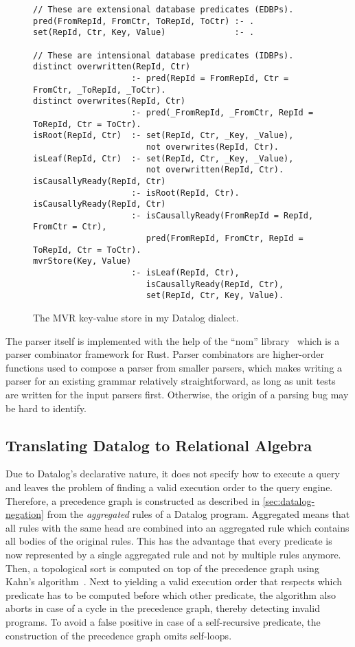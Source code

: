 \begin{figure}[htpb]
	\begin{lstlisting}[keepspaces]
// These are extensional database predicates (EDBPs).
pred(FromRepId, FromCtr, ToRepId, ToCtr) :- .
set(RepId, Ctr, Key, Value)              :- .

// These are intensional database predicates (IDBPs).
distinct overwritten(RepId, Ctr)
                    :- pred(RepId = FromRepId, Ctr = FromCtr, _ToRepId, _ToCtr).
distinct overwrites(RepId, Ctr)
                    :- pred(_FromRepId, _FromCtr, RepId = ToRepId, Ctr = ToCtr).
isRoot(RepId, Ctr)  :- set(RepId, Ctr, _Key, _Value),
                       not overwrites(RepId, Ctr).
isLeaf(RepId, Ctr)  :- set(RepId, Ctr, _Key, _Value),
                       not overwritten(RepId, Ctr).
isCausallyReady(RepId, Ctr)
                    :- isRoot(RepId, Ctr).
isCausallyReady(RepId, Ctr)
                    :- isCausallyReady(FromRepId = RepId, FromCtr = Ctr),
                       pred(FromRepId, FromCtr, RepId = ToRepId, Ctr = ToCtr).
mvrStore(Key, Value)
                    :- isLeaf(RepId, Ctr),
                       isCausallyReady(RepId, Ctr),
                       set(RepId, Ctr, Key, Value).\end{lstlisting}
	\caption{The \ac{MVR} key-value store in my Datalog dialect.}\label{code:mvr-crdt-datalog-dialect}
\end{figure}

The parser itself is implemented with the help of the ``nom'' library~\cite{nom}
which is a parser combinator framework for Rust.
Parser combinators are higher-order functions used to compose a parser
from smaller parsers, which makes writing a parser for an existing grammar
relatively straightforward, as long as unit tests are written for the input
parsers first. Otherwise, the origin of a parsing bug may be hard to identify.

\subsection{Translating Datalog to Relational Algebra}\label{sec:datalog-to-relational-algebra}

Due to Datalog's declarative nature, it does not specify how to execute a query
and leaves the problem of finding a valid execution order to the query engine.
Therefore, a precedence graph is constructed as described in \ref{sec:datalog-negation}
from the \emph{aggregated} rules of a Datalog program.
Aggregated means that all rules with the same head are combined into an
aggregated rule which contains all bodies of the original rules.
This has the advantage that every predicate is now represented by a single
aggregated rule and not by multiple rules anymore.
Then, a topological sort is computed on top of the precedence graph using
Kahn's algorithm~\cite{kahn1962topological}.
Next to yielding a valid execution order that respects which predicate has
to be computed before which other predicate, the algorithm also aborts in
case of a cycle in the precedence graph, thereby detecting invalid programs.
To avoid a false positive in case of a self-recursive predicate,
the construction of the precedence graph omits self-loops.

